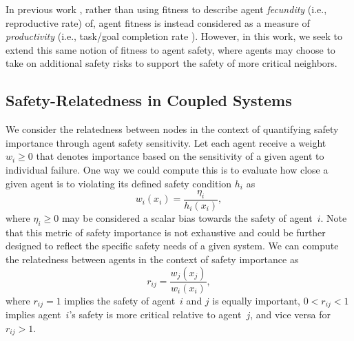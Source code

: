 \documentclass[letterpaper, 10 pt, conference]{ieeeconf}  %
\theoremstyle{plain}
\begin{document}
In previous work \cite{butler2025hamilton}, rather than using fitness to describe agent \textit{fecundity} (i.e., reproductive rate) of, agent fitness is instead considered as a measure of \textit{productivity} (i.e., task/goal completion rate \cite{nguyen2024scalable}). However, in this work, we seek to extend this same notion of fitness to agent safety, where agents may choose to take on additional safety risks to support the safety of more critical neighbors.

\subsection{Safety-Relatedness in Coupled Systems}
We consider the relatedness between nodes in the context of quantifying safety importance through
agent safety sensitivity. 
Let each agent receive a weight $w_i \geq 0$ that denotes importance based on the sensitivity of a given agent to individual failure. One way we could compute this is to evaluate how close a given agent is to violating its defined safety condition $h_i$ as
\begin{equation} \label{eq:w_i^s}
    w_i(x_i) = \frac{\eta_i}{h_i(x_i)},
\end{equation}
where $\eta_i \geq 0$ may be considered a scalar bias towards the safety of agent~$i$. 
Note that this metric of safety importance is not exhaustive and could be further designed to reflect the specific safety needs of a given system.
We can compute the relatedness between agents in the context of safety importance as
\begin{equation} \label{eq:r_ij}
    r_{ij} = \frac{w_j(x_j)}{w_i(x_i)},
\end{equation}
where $r_{ij} = 1$ implies the safety of agent~$i$ and $j$ is equally important, $0 < r_{ij} < 1$ implies agent~$i$'s safety is more critical relative to agent~$j$, and vice versa for $r_{ij} > 1$.
\end{document}
